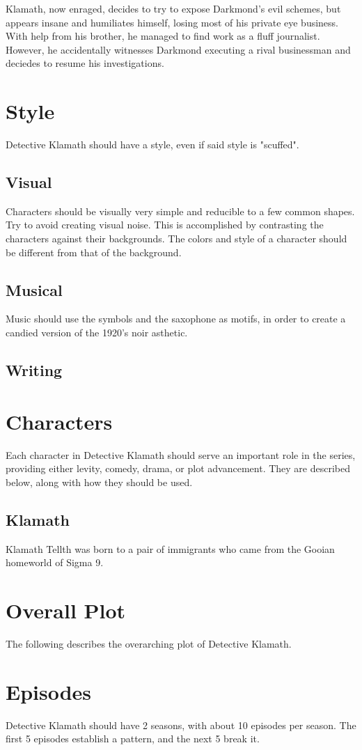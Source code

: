 \documentclass{article}
\begin{document}
Klamath, now enraged, decides to try to expose Darkmond's evil schemes, but appears insane and humiliates himself, losing most of his private eye business. With help from his brother, he managed to find work as a fluff journalist. However, he accidentally witnesses Darkmond executing a rival businessman and deciedes to resume his investigations.

\section{Style}

Detective Klamath should have a style, even if said style is "scuffed".

\subsection{Visual}

Characters should be visually very simple and reducible to a few common shapes. Try to avoid creating visual noise. This is accomplished by contrasting the characters against their backgrounds. The colors and style of a character should be different from that of the background.

\subsection{Musical}

Music should use the symbols and the saxophone as motifs, in order to create a candied version of the 1920's noir asthetic.

\subsection{Writing}

\section{Characters}

Each character in Detective Klamath should serve an important role in the series, providing either levity, comedy, drama, or plot advancement. They are described below, along with how they should be used.

\subsection{Klamath}

Klamath Tellth was born to a pair of immigrants who came from the Gooian homeworld of Sigma 9.

\section{Overall Plot}

The following describes the overarching plot of Detective Klamath.

\section{Episodes}

Detective Klamath should have 2 seasons, with about 10 episodes per season. The first 5 episodes establish a pattern, and the next 5 break it.
\end{document}
